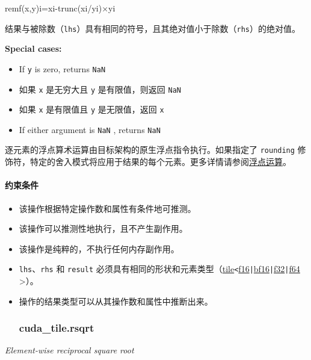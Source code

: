 \documentclass{article}
\begin{document}
remf(x,y)i=xi-trunc(xi/yi)×yi


结果与被除数（\texttt{lhs}）具有相同的符号，且其绝对值小于除数（\texttt{rhs}）的绝对值。



\textbf{Special cases:}




\begin{itemize}
\item If \texttt{y} is zero, returns \texttt{NaN}

\item 如果 \texttt{x} 是无穷大且 \texttt{y} 是有限值，则返回 \texttt{NaN}
\item 如果 \texttt{x} 是有限值且 \texttt{y} 是无限值，返回 \texttt{x}
\item If either argument is \texttt{NaN} , returns \texttt{NaN}



\end{itemize}
逐元素的浮点算术运算由目标架构的原生浮点指令执行。如果指定了 \texttt{rounding} 修饰符，特定的舍入模式将应用于结果的每个元素。更多详情请参阅\href{https://docs.nvidia.com/cuda/tile-ir/latest/sections/operations.html#op-group-floating-point}{浮点运算}。





\paragraph{约束条件}


\begin{itemize}
\item 该操作根据特定操作数和属性有条件地可推测。
\item 该操作可以推测性地执行，且不产生副作用。
\item 该操作是纯粹的，不执行任何内存副作用。
\item \texttt{lhs}、\texttt{rhs} 和 \texttt{result} 必须具有相同的形状和元素类型（\href{https://docs.nvidia.com/cuda/tile-ir/latest/sections/types.html#type-tile}{tile}\texttt{<}\href{https://docs.nvidia.com/cuda/tile-ir/latest/sections/types.html#subsection-element-types}{f16}\texttt{|}\href{https://docs.nvidia.com/cuda/tile-ir/latest/sections/types.html#subsection-element-types}{bf16}\texttt{|}\href{https://docs.nvidia.com/cuda/tile-ir/latest/sections/types.html#subsection-element-types}{f32}\texttt{|}\href{https://docs.nvidia.com/cuda/tile-ir/latest/sections/types.html#subsection-element-types}{f64} >）。
\item 操作的结果类型可以从其操作数和属性中推断出来。




\subsubsection{cuda\_tile.rsqrt}


\end{itemize}
\textit{Element-wise reciprocal square root}
\end{document}
